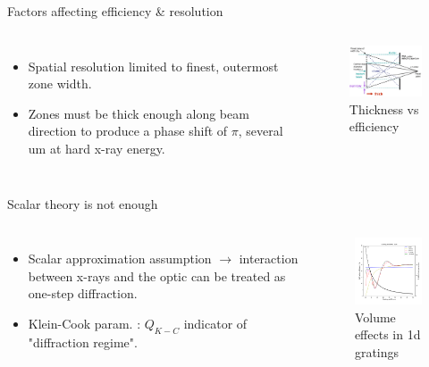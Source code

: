\documentclass{beamer}
\begin{document}
\begin{frame}{Factors affecting efficiency \& resolution}
	\begin{block}{}
		\begin{columns}[onlytextwidth,T]
			\column{\dimexpr\linewidth-30mm-10mm}
			\begin{itemize}
				\item Spatial resolution limited to finest, outermost zone width.
				\item Zones must be thick enough along beam direction to produce a phase shift of $\pi$, several um at hard x-ray energy.
			\end{itemize}
			\column{30mm}
			\begin{figure}
				\hspace*{-1.1cm}\includegraphics[width=50mm]{zp_chris}
				\caption{Thickness vs efficiency \footnotemark}
			\end{figure}
		\end{columns}
	\end{block}
\end{frame}

\begin{frame}{Scalar theory is not enough}
	\begin{block}{}
		\begin{columns}[onlytextwidth,T]
			\column{\dimexpr\linewidth-30mm-10mm}
			\begin{itemize}
				\item Scalar approximation assumption $\rightarrow$ interaction between x-rays and the optic can be treated as one-step diffraction. 
				\item Klein-Cook param. : $Q_{K-C}$ indicator of 
				"diffraction regime"\footnotemark.
			\end{itemize}
			\column{30mm}
			\begin{figure}
				\hspace*{-0.75cm}\includegraphics[width=45mm]{grating}
				\caption{Volume effects in 1d gratings}
			\end{figure}
		\end{columns}
	\end{block}
\end{frame}
\end{document}
